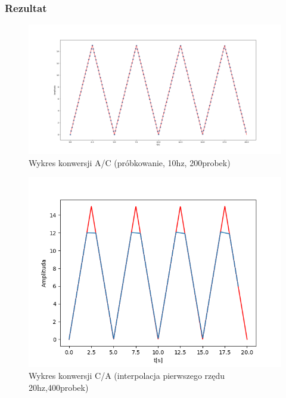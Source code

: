 \documentclass[12pt]{article}
\begin{document}
\subsubsection{Rezultat}
\begin{figure}[H]
\centering
\includegraphics[scale=0.3]{7trojkatProbkowanie200.png}
\caption{Wykres konwersji A/C (próbkowanie, 10hz, 200probek)}
\end{figure}
\begin{figure}[H]
\centering
\includegraphics[scale=0.6]{8trojkatInterp1rzedu20.png}
\caption{Wykres konwersji C/A (interpolacja pierwszego rzędu 20hz,400probek)}
\end{figure}
\end{document}
